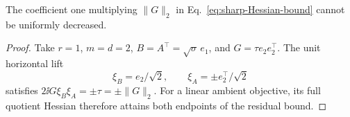 \begin{proposition}
The coefficient one multiplying $\|G\|_2$ in
Eq.~\eqref{eq:sharp-Hessian-bound} cannot be uniformly decreased.
\end{proposition}
\begin{proof}
Take $r=1$, $m=d=2$, $B=A^\top=\sqrt\sigma\,e_1$, and
$G=\tau e_2e_2^\top$. The unit horizontal lift
\begin{equation}
\xi_B=e_2/\sqrt2,\qquad \xi_A=\pm e_2^\top/\sqrt2
\end{equation}
satisfies $2\ii G{\xi_B\xi_A}=\pm\tau=\pm\|G\|_2$.
For a linear ambient objective, its full quotient Hessian therefore
attains both endpoints of the residual bound.
\end{proof}
